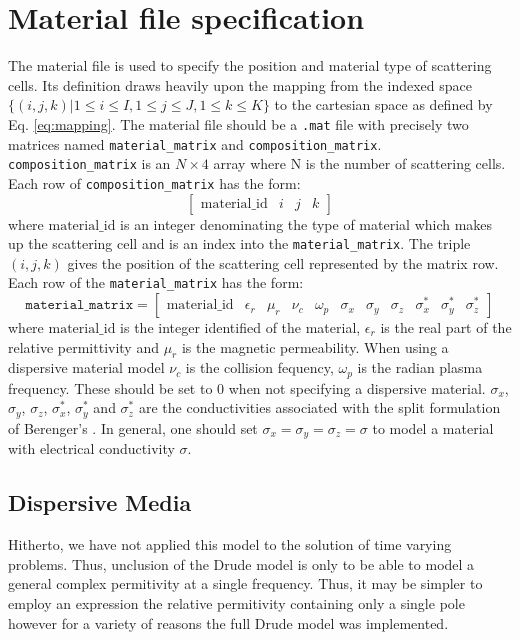 \documentclass[a4paper, 12pt]{article}
\begin{document}
	\section{Material file specification}
	The material file is used to specify the position and material type of
	scattering cells. Its definition draws heavily upon the mapping from
	the indexed space $\{(i,j,k)|1\le i\le I,1\le j\le J,1\le k\le K\}$ to
	the cartesian space as defined by Eq. \ref{eq:mapping}. The material
	file should be a \verb+.mat+ file with precisely two matrices named
	\verb+material_matrix+ and
	\verb+composition_matrix+. \verb+composition_matrix+ is an $N\times 4$
	array where N is the number of scattering cells. Each row of
	\verb+composition_matrix+ has the form:
	\begin{equation}
		\left[\begin{array}{llll} \textrm{material\_id}&i&j&k \end{array}\right]
	\end{equation}
	where $\textrm{material\_id}$ is an integer  denominating the
	type of material which makes up the scattering cell and is an index
	into the \verb+material_matrix+. The triple $(i,j,k)$ gives the
	position of the scattering cell represented by the matrix row. Each
	row of the \verb+material_matrix+ has the form:
	\begin{equation}
		\texttt{material\_matrix}=\left[\begin{array}{lllllllllll}\textrm{material\_id}
			& \epsilon_r & \mu_r & \nu_c & \omega_p & \sigma_x & \sigma_y &
			\sigma_z & \sigma_x^* & \sigma_y^* &
			\sigma_z^* \end{array}\right]
	\end{equation}
	where $\textrm{material\_id}$ is the integer identified of the
	material, $\epsilon_r$ is the real part of the relative permittivity and
	$\mu_r$ is the magnetic permeability. When using a dispersive material
	model $\nu_c$ is the collision
	fequency, $\omega_p$ is the radian plasma frequency. These should be
	set to 0 when not specifying a dispersive material. $\sigma_x$,
	$\sigma_y$, $\sigma_z$, $\sigma_x^*$, $\sigma_y^*$ and $\sigma_z^*$
	are the conductivities associated with the split formulation of
	Berenger's \cite{taflove00book}. In general, one should set
	$\sigma_x=\sigma_y=\sigma_z=\sigma$ to model a material with
	electrical conductivity $\sigma$.
	\subsection{Dispersive Media}\label{sec:drude}
	Hitherto, we have not applied this model to the solution of time
	varying problems. Thus, unclusion of the Drude model is only to be
	able to model a general complex permitivity at a single
	frequency. Thus, it may be simpler to employ an expression the
	relative permitivity containing only a single pole however for a
	variety of reasons the full Drude model was implemented.
\end{document}
